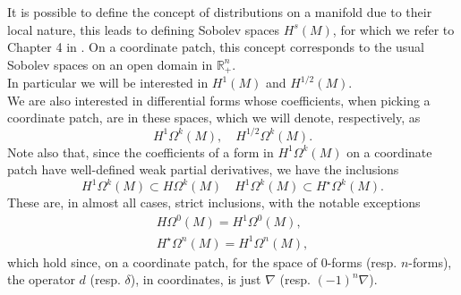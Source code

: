 \documentclass{ifacconf}
\newcommand{\R}{\mathbb{R}}
\newcommand{\drh}[2]{\Omega^{#2}(#1)}
\begin{document}
It is possible to define the concept of distributions on a manifold due to their local nature, this leads to defining Sobolev spaces $H^s(M)$, for which we refer to Chapter 4 in \cite{PD1:96}. On a coordinate patch, this concept corresponds to the usual Sobolev spaces on an open domain in $\R^n_+$.\\
In particular we will be interested in $H^1(M)$ and $H^{1/2}(M)$.\\
We are also interested in differential forms whose coefficients, when picking a coordinate patch, are in these spaces, which we will denote, respectively, as
\[
    H^1\drh{M}{k},\quad H^{1/2}\drh{M}{k}.
\]
Note also that, since the coefficients of a form in $H^1\drh{M}{k}$ on a coordinate patch have well-defined weak partial derivatives, we have the inclusions
\[ H^1\drh{M}{k}\subset H\drh{M}{k}\quad H^1\drh{M}{k}\subset H^{\star}\drh{M}{k}.\]
These are, in almost all cases, strict inclusions, with the notable exceptions
\begin{align*}
    H\drh{M}{0}=H^1\drh{M}{0},\\
    H^{\star}\drh{M}{n}=H^1\drh{M}{n},
\end{align*}
which hold since, on a coordinate patch, for the space of $0$-forms (resp. $n$-forms), the operator $d$ (resp. $\delta$), in coordinates, is just $\nabla$ (resp. $(-1)^n\nabla$).
\end{document}
